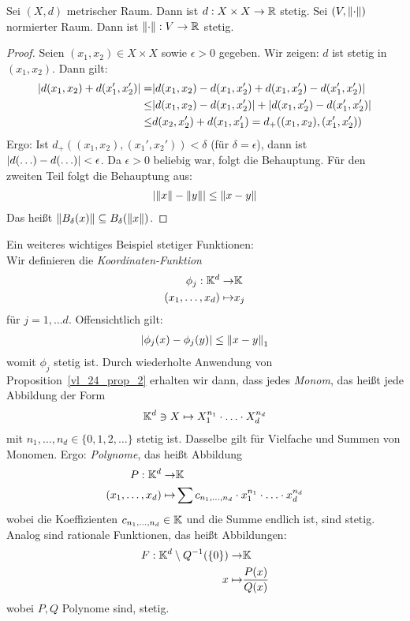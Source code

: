 \begin{Proposition}{%
	Sei $(X,d)$ metrischer Raum. Dann ist $d: X \times X \rightarrow \mathbb{R}$ stetig. 
	Sei $(V, \norm{\cdot})$ normierter Raum. Dann ist $\norm{\cdot} : V \rightarrow 
	\mathbb{R}$ stetig.
}\end{Proposition}

\begin{proof}
	Seien $(x_1, x_2) \in X \times X$ sowie $\epsilon > 0$ gegeben. Wir zeigen: 
	$d$ ist stetig in $(x_1, x_2)$.
	Dann gilt:
	\begin{align*}
		\abs{d(x_1,x_2) + d(x_1', x_2')} = & 
		\abs{d(x_1,x_2) - d(x_1, x_2') 
			+ d(x_1,x_2') - d(x_1',x_2')} \\ \leq &
		\abs{d(x_1,x_2) - d(x_1, x_2')} + 
			\abs{d(x_1,x_2')-d(x_1',x_2')} \\ \leq &
		d(x_2, x_2') + d(x_1, x_1') = 
		d_+ ((x_1,x_2), (x_1', x_2'))
	\end{align*}
	Ergo: Ist $d_+((x_1,x_2), (x_1',x_2')) < \delta$ (für $\delta = 
	\epsilon$), dann ist $\abs{d(\hdots) - d(\hdots)} < \epsilon$. 
	Da $\epsilon > 0$ beliebig war, folgt die Behauptung. 
	Für den zweiten Teil folgt die Behauptung aus:
	\begin{align*}
		\abs{\norm{x} - \norm{y}} \leq \norm{x-y}
	\end{align*}
	Das heißt $\norm{B_\delta(x)} \subseteq B_\delta(\norm{x})$.
\end{proof}
Ein weiteres wichtiges Beispiel stetiger Funktionen: \\
Wir definieren die \emph{Koordinaten-Funktion}
\begin{align*}
	\phi_j : \mathbb{K}^d \rightarrow & \mathbb{K} \\
		(x_1, \hdots, x_d) \mapsto & x_j
\end{align*}
für $j = 1, \hdots d$. Offensichtlich gilt: 
\begin{align*}
	\abs{\phi_j(x)-\phi_j(y)} \leq \norm{x-y}_1
\end{align*}
womit $\phi_j$ stetig ist. Durch wiederholte Anwendung von 
Proposition~\ref{vl_24_prop_2} erhalten wir dann, dass jedes \emph{Monom}, 
das heißt jede Abbildung der Form 
\begin{align*}
	\mathbb{K}^d \owns X \mapsto X_1^{n_1} \cdot \hdots \cdot X_d^{n_d}
\end{align*}
mit $n_1, \hdots , n_d \in \{0,1,2,\hdots \}$ stetig ist.
Dasselbe gilt für Vielfache und Summen von Monomen. Ergo: \emph{Polynome}, das heißt 
Abbildung
\begin{align*}
	P: \mathbb{K}^d \rightarrow & \mathbb{K} \\
	(x_1, \hdots, x_d) \mapsto & \sum c_{n_1, \hdots, n_d} \cdot x_1^{n_1}\cdot 
	\hdots \cdot x_d^{n_d}
\end{align*}
wobei die Koeffizienten $c_{n_1,\hdots, n_d} \in \mathbb{K}$ und die Summe endlich ist, 
sind stetig. Analog sind rationale Funktionen, das heißt Abbildungen:
\begin{align*}
	F: \mathbb{K}^d \setminus Q^{-1}(\{0\}) \rightarrow & \mathbb{K} \\
	x \mapsto & \frac{P(x)}{Q(x)}
\end{align*}
wobei $P,Q$ Polynome sind, stetig.